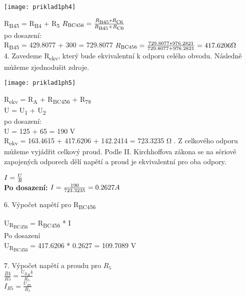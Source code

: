 \documentclass[12pt,a4paper]{article} %
\begin{document}
	    \centerline{
		\texttt{[image: priklad1ph4]}
		}
	    
	    \medskip
	    R\textsubscript{B45} = R\textsubscript{B4} + R\textsubscript{5}
	    \(
		\\R\textsubscript{BC456} = \frac{R\textsubscript{B45} * R\textsubscript{C6}}{R\textsubscript{B45} + R\textsubscript{C6}}
	    \)
	    \bigskip
	    \\po dosazení:
	    \\R\textsubscript{B45} = 429.8077 + 300 = 729.8077
	    \(
		\\R\textsubscript{BC456} = \frac{729.8077 * 976.2821}{729.8077 + 976.2821} =  417.6206\si{\ohm}
	    \)
	    \bigskip
	   \\4. Zavedeme R\textsubscript{ekv}, který bude ekvivalentní k odporu celého obvodu. Následně můžeme zjednodušit zdroje.
	    \medskip
	    	    	    
	    \centerline{
		\texttt{[image: priklad1ph5]}
		}
	    
	    \medskip
	    R\textsubscript{ekv} = R\textsubscript{A} + R\textsubscript{BC456} + R\textsubscript{78}
	    \\U = U\textsubscript{1} + U\textsubscript{2}
	    \bigskip
	    \\po dosazení:
	    \\U = 125 + 65 = 190 V
	    \\R\textsubscript{ekv} =  163.4615 + 417.6206 + 142.2414 = 723.3235 \si{\ohm}
	    . Z celkového odporu můžeme vyjádřit celkový proud. Podle II. Kirchhoffova zákona se na sériově zapojených odporech dělí napětí a proud je ekvivalentní pro oba odpory.
	    \medskip
	    
	    \(
		\\I = \frac{U}{R}
	    \)
	    \bigskip
	     \\\textbf{Po dosazení:}
	    \(
		\\I = \frac{190}{723.3235} = 0.2627 A
	    \)
	    \bigskip
        
        6. Výpočet napětí pro R\textsubscript{BC456}
        
        U\textsubscript{R\textsubscript{BC456}} = R\textsubscript{BC456} * I
        \\Po dosazení
        \\U\textsubscript{R\textsubscript{BC456}} = 417.6206 * 0.2627 = 109.7089 V
        \bigskip
        
        7. Výpočet napětí a proudu pro $R_5$ 
        \\$\frac{B4}{R5} = \frac{{U_R}_B4}{R_5}$
        \\$I_{R5} = \frac{U_{R5}}{R_5}$
        
\end{document}
